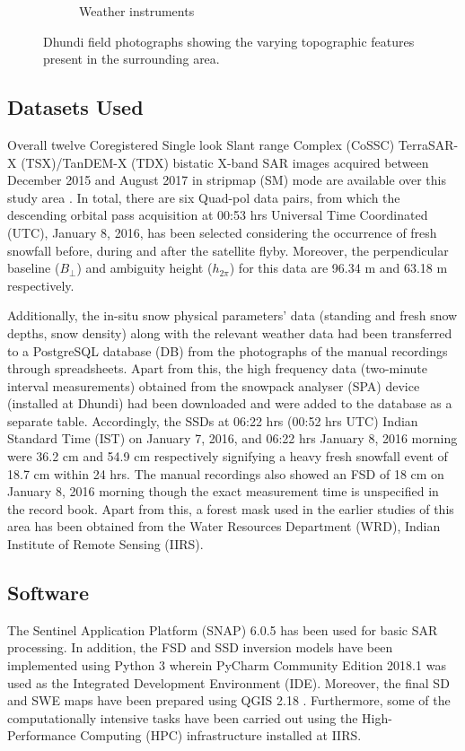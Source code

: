 \documentclass[review]{elsarticle}
\begin{document}
\begin{figure}[htb]
\begin{subfigure}[t]{0.49\textwidth}
        \caption{Weather instruments}
        \label{subfig:stations}
    \end{subfigure}
    \caption{Dhundi field photographs showing the varying topographic features present in the surrounding area.}
    \label{fig:field}
\end{figure}

\subsection{Datasets Used}

Overall twelve Coregistered Single look Slant range Complex (CoSSC) TerraSAR-X (TSX)/TanDEM-X (TDX) bistatic X-band SAR images acquired between December 2015 and August 2017 in stripmap (SM) mode are available over this study area \citep{Balss2012}. In total, there are six Quad-pol data pairs, from which the descending orbital pass acquisition at 00:53 hrs Universal Time Coordinated (UTC), January 8, 2016, has been selected considering the occurrence of fresh snowfall before, during and after the satellite flyby. Moreover, the perpendicular baseline ($B_\bot$) and ambiguity height ($h_{2\pi}$) for this data are 96.34 m and 63.18 m respectively. 

Additionally, the in-situ snow physical parameters’ data (standing and fresh snow depths, snow density) along with the relevant weather data had been transferred to a PostgreSQL database (DB) \citep{PostgreSQL2019} from the photographs of the manual recordings through spreadsheets. Apart from this, the high frequency data (two-minute interval measurements) obtained from the snowpack analyser (SPA) device (installed at Dhundi) had been downloaded and were added to the database as a separate table. Accordingly, the SSDs at 06:22 hrs (00:52 hrs UTC) Indian Standard Time (IST) on January 7, 2016, and 06:22 hrs January 8, 2016 morning were 36.2 cm and 54.9 cm respectively signifying a heavy fresh snowfall event of 18.7 cm within 24 hrs. The manual recordings also showed an FSD of 18 cm on January 8, 2016 morning though the exact measurement time is unspecified in the record book. Apart from this, a forest mask used in the earlier studies of this area \citep{Thakur2012, Thakur2017} has been obtained from the Water
Resources Department (WRD), Indian Institute of Remote Sensing (IIRS).

\subsection{Software}
The Sentinel Application Platform (SNAP) 6.0.5 \citep{ESA2018} has been used for basic SAR processing. In addition, the FSD and SSD inversion models have been implemented using Python 3 wherein PyCharm Community Edition 2018.1 \citep{JetBrains2018} was used as the Integrated Development Environment (IDE). Moreover, the final SD and SWE maps have been prepared using QGIS 2.18 \citep{QGIS2016}. Furthermore, some of the computationally intensive tasks have been carried out using the High-Performance Computing (HPC) infrastructure installed at IIRS.
\end{document}
